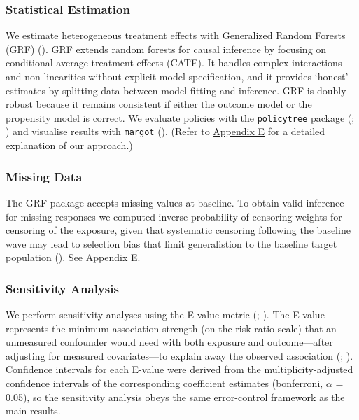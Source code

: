 \documentclass[
  single column]{article}
\begin{document}
\subsubsection{Statistical Estimation}\label{statistical-estimation}

We estimate heterogeneous treatment effects with Generalized Random
Forests (GRF) (). GRF
extends random forests for causal inference by focusing on conditional
average treatment effects (CATE). It handles complex interactions and
non-linearities without explicit model specification, and it provides
`honest' estimates by splitting data between model-fitting and
inference. GRF is doubly robust because it remains consistent if either
the outcome model or the propensity model is correct. We evaluate
policies with the \texttt{policytree} package
(; )
and visualise results with \texttt{margot}
(). (Refer to
\hyperref[appendix-explain-grf]{Appendix E} for a detailed explanation
of our approach.)

\subsubsection{Missing Data}\label{missing-data}

The GRF package accepts missing values at baseline. To obtain valid
inference for missing responses we computed inverse probability of
censoring weights for censoring of the exposure, given that systematic
censoring following the baseline wave may lead to selection bias that
limit generalistion to the baseline target population
(). See
\hyperref[appendix-explain-grf]{Appendix E}.

\subsubsection{Sensitivity Analysis}\label{sensitivity-analysis}

We perform sensitivity analyses using the E-value metric
(;
). The E-value
represents the minimum association strength (on the risk-ratio scale)
that an unmeasured confounder would need with both exposure and
outcome---after adjusting for measured covariates---to explain away the
observed association (; ).
Confidence intervals for each E-value were derived from the
multiplicity-adjusted confidence intervals of the corresponding
coefficient estimates (bonferroni, \(\alpha\) = 0.05), so the
sensitivity analysis obeys the same error-control framework as the main
results.
\end{document}
